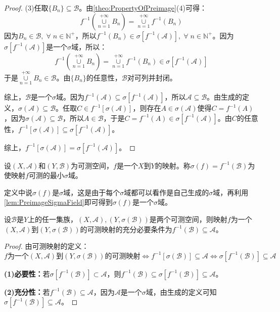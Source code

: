 \begin{proof}
	(3)任取$\{B_n\}\subseteq\mathscr{B}$。由\cref{theo:PropertyOfPreimage}(4)可得：
	\begin{equation*}
		f^{-1}\left(\underset{n=1}{\overset{+\infty}{\cup}}B_n\right)=\underset{n=1}{\overset{+\infty}{\cup}}f^{-1}(B_n)
	\end{equation*}
	因为$B_n\in\mathscr{B},\;\forall\;n\in\mathbb{N}^+$，所以$f^{-1}(B_n)\in\sigma[f^{-1}(\mathscr{A})],\;\forall\;n\in\mathbb{N}^+$。因为$\sigma[f^{-1}(\mathscr{A})]$是一个$\sigma$域，所以：
	\begin{equation*}
		f^{-1}\left(\underset{n=1}{\overset{+\infty}{\cup}}B_n\right)=\underset{n=1}{\overset{+\infty}{\cup}}f^{-1}(B_n)\in\sigma[f^{-1}(\mathscr{A})]
	\end{equation*}
	于是$\underset{n=1}{\overset{+\infty}{\cup}}B_n\in\mathscr{B}$。由$\{B_n\}$的任意性，$\mathscr{B}$对可列并封闭。\par
	综上，$\mathscr{B}$是一个$\sigma$域。因为$f^{-1}(\mathscr{A})\subseteq\sigma[f^{-1}(\mathscr{A})]$，所以$\mathscr{A}\subseteq\mathscr{B}$。由生成的定义，$\sigma(\mathscr{A})\subseteq\mathscr{B}$。任取$C\in f^{-1}[\sigma(\mathscr{A})]$，则存在$A\in\sigma(\mathscr{A})$使得$C=f^{-1}(A)$，因为$\sigma(\mathscr{A})\subseteq\mathscr{B}$，所以$A\in\mathscr{B}$，于是$C=f^{-1}(A)\in\sigma[f^{-1}(\mathscr{A})]$。由$C$的任意性，$f^{-1}[\sigma(\mathscr{A})]\subseteq\sigma[f^{-1}(\mathscr{A})]$。\par
	综上，$f^{-1}[\sigma(\mathscr{A})]=\sigma[f^{-1}(\mathscr{A})]$。
\end{proof}
\begin{definition}
	设$(X,\mathscr{A})$和$(Y,\mathscr{B})$为可测空间，$f$是一个$X$到$Y$的映射。称$\sigma(f)=f^{-1}(\mathscr{B})$为使映射$f$可测的最小$\sigma$域。
\end{definition}
\begin{note}
	定义中说$\sigma(f)$是$\sigma$域，这是由于每个$\sigma$域都可以看作是自己生成的$\sigma$域，再利用\cref{lem:PreimageSigmaField}即可得到$\sigma(f)$是一个$\sigma$域。
\end{note}
\begin{theorem}\label{theo:SigmaMeasurable}
	设$\mathscr{B}$是$Y$上的任一集族，$(X,\mathscr{A}),(Y,\sigma(\mathscr{B}))$是两个可测空间，则映射$f$为一个$(X,\mathscr{A})$到$(Y,\sigma(\mathscr{B}))$的可测映射的充分必要条件为$f^{-1}(\mathscr{B})\subseteq\mathscr{A}$。
\end{theorem}
\begin{proof}
	由可测映射的定义：
	\begin{equation*}
		\text{$f$为一个$(X,\mathscr{A})$到$(Y,\sigma(\mathscr{B}))$的可测映射}
		\Leftrightarrow f^{-1}[\sigma(\mathscr{B})]\subseteq\mathscr{A}
		\Leftrightarrow
		\sigma[f^{-1}(\mathscr{B})]\subseteq\mathscr{A}
	\end{equation*}\par
	\textbf{(1)必要性：}若$\sigma[f^{-1}(\mathscr{B})]\subset\mathscr{A}$，则$f^{-1}(\mathscr{B})\subseteq\sigma[f^{-1}(\mathscr{B})]\subseteq\mathscr{A}$。\par
	\textbf{(2)充分性：}若$f^{-1}(\mathscr{B})\subseteq\mathscr{A}$，因为$\mathscr{A}$是一个$\sigma$域，由生成的定义可知$\sigma[f^{-1}(\mathscr{B})]\subseteq\mathscr{A}$。
\end{proof}
